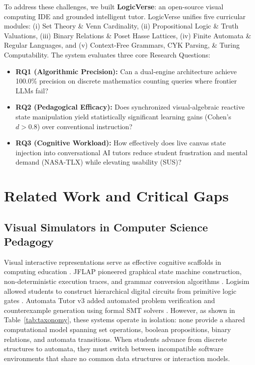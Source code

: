 \documentclass[conference]{IEEEtran}
\begin{document}
To address these challenges, we built \textbf{LogicVerse}: an open-source visual computing IDE and grounded intelligent tutor. LogicVerse unifies five curricular modules: (i) Set Theory \& Venn Cardinality, (ii) Propositional Logic \& Truth Valuations, (iii) Binary Relations \& Poset Hasse Lattices, (iv) Finite Automata \& Regular Languages, and (v) Context-Free Grammars, CYK Parsing, \& Turing Computability. The system evaluates three core Research Questions:
\begin{itemize}
    \item \textbf{RQ1 (Algorithmic Precision):} Can a dual-engine architecture achieve 100.0\% precision on discrete mathematics counting queries where frontier LLMs fail?
    \item \textbf{RQ2 (Pedagogical Efficacy):} Does synchronized visual-algebraic reactive state manipulation yield statistically significant learning gains (Cohen's $d > 0.8$) over conventional instruction?
    \item \textbf{RQ3 (Cognitive Workload):} How effectively does live canvas state injection into conversational AI tutors reduce student frustration and mental demand (NASA-TLX) while elevating usability (SUS)?
\end{itemize}

\section{Related Work and Critical Gaps}
\subsection{Visual Simulators in Computer Science Pedagogy}
Visual interactive representations serve as effective cognitive scaffolds in computing education \cite{rodger2006jflap, burch2002logisim}. JFLAP pioneered graphical state machine construction, non-deterministic execution traces, and grammar conversion algorithms \cite{rodger2006jflap}. Logisim allowed students to construct hierarchical digital circuits from primitive logic gates \cite{burch2002logisim}. Automata Tutor v3 added automated problem verification and counterexample generation using formal SMT solvers \cite{dantoni2020automata}. However, as shown in Table~\ref{tab:taxonomy}, these systems operate in isolation: none provide a shared computational model spanning set operations, boolean propositions, binary relations, and automata transitions. When students advance from discrete structures to automata, they must switch between incompatible software environments that share no common data structures or interaction models.
\end{document}
